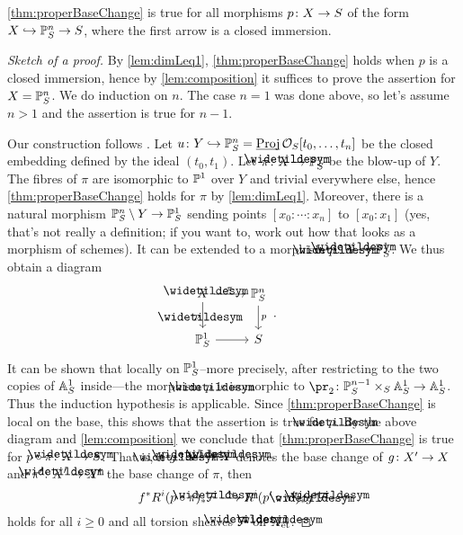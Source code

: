 \documentclass[a4paper, 10pt, oneside, DIV=9, chapterprefix=true, numbers=enddot, bibliography=totoc]{scrbook}
\begin{document}
\begin{lem}\label{lem:PBCprojective}
	\cref{thm:properBaseChange} is true for all morphisms $p\colon X\morphism S$ of the form $X\monomorphism \IP_S^n\morphism S$, where the first arrow is a closed immersion.
\end{lem}
\begin{proof}[Sketch of a proof]
	By \cref{lem:dimLeq1}, \cref{thm:properBaseChange} holds when $p$ is a closed immersion, hence by \cref{lem:composition} it suffices to prove the assertion for $X=\mathbb{P}_S^n$. We do induction on $n$. The case $n=1$ was done above, so let's assume $n>1$ and the assertion is true for $n-1$.
	
	Our construction follows \cite[Arcata~III.4]{sga4.5}. Let $u\colon Y\monomorphism \IP_S^n=\PROJ \Oo_S[t_0,\dotsc,t_n]$ be the closed embedding defined by the ideal $(t_0,t_1)$. Let $\pi\colon \snake{X}\morphism \IP_S^n$ be the blow-up of $Y$. The fibres of $\pi$ are isomorphic to $\mathbb{P}^1$ over $Y$ and trivial everywhere else, hence \cref{thm:properBaseChange} holds for $\pi$ by \cref{lem:dimLeq1}. Moreover, there is a natural morphism $\IP_S^n\setminus Y\morphism \IP_S^1$ sending points $[x_0:\dotsb:x_n]$ to $[x_0:x_1]$ (yes, that's not really a definition; if you want to, work out how that looks as a morphism of schemes). It can be extended to a morphism $\snake{p}\colon \snake{X}\morphism \IP_S^1$. We thus obtain a diagram
	\begin{equation*}
		\begin{tikzcd}
			\snake{X}\dar["\snake{p}"',pos=0.57]\rar["\pi"] & \IP_S^n\dar["p"]\\
			\IP_S^1\rar &S
		\end{tikzcd}\,.
	\end{equation*}
	It can be shown that locally on $\mathbb{P}_S^1$--more precisely, after restricting to the two copies of $\mathbb{A}_S^1$ inside---the morphism $\snake{p}$ is isomorphic to $\pr_2\colon \IP_S^{n-1}\times_S\IA_S^1\morphism \IA_S^1$. Thus the induction hypothesis is applicable. Since \cref{thm:properBaseChange} is local on the base, this shows that the assertion is true for $\snake{p}$. By the above diagram and \cref{lem:composition} we conclude that \cref{thm:properBaseChange} is true for $p\circ \pi\colon \snake{X}\morphism S$. That is, if $\snake{g}\colon \snake{X}'\morphism\snake{X}$ denotes the base change of $g\colon X'\morphism X$ and $\pi'\colon \snake{X}'\morphism X'$ the base change of $\pi$, then
	\begin{equation*}
		f^*R^i(p\circ \pi)_*\snake{\Ff}\isomorphism R^i(p'\circ \pi')_*\snake{g}^*\snake{\Ff}
	\end{equation*}
	holds for all $i\geq 0$ and all torsion sheaves $\snake{\Ff}$ on $\snake{X}_\et$.
	

\end{proof}
\end{document}
